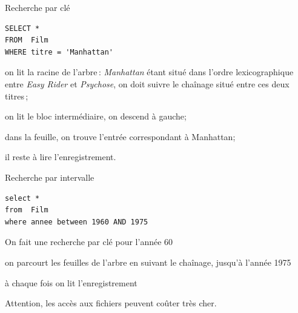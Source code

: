 \begin{frame}[fragile]{Recherche par clé}

\begin{verbatim}
SELECT *
FROM  Film
WHERE titre = 'Manhattan'
\end{verbatim}

\begin{redbullet}
   \item on lit la racine de l'arbre\,: {\it Manhattan} étant situé dans
   l'ordre lexicographique entre {\it Easy Rider} et {\it Psychose},
   on doit suivre le chaînage situé entre ces deux titres\,;

  \item on lit le bloc intermédiaire, on descend à gauche;
  
  \item dans la feuille, on trouve l'entrée correspondant à Manhattan;

  \item il reste à lire l'enregistrement. 
\end{redbullet}

\end{frame}
\begin{frame}[fragile]{Recherche par intervalle}

\begin{verbatim}
select *
from  Film
where annee between 1960 AND 1975
\end{verbatim}

\begin{redbullet}
   \item On fait une recherche par clé pour l'année 60

  \item on parcourt les feuilles de l'arbre en suivant le chaînage,
            jusqu'à l'année 1975

  \item à chaque fois on lit l'enregistrement
\end{redbullet}

Attention, les accès aux fichiers peuvent coûter très cher.

\end{frame}

